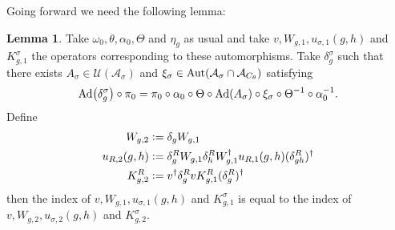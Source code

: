 \documentclass[12pt,a4paper,twoside]{article}
\newcommand{\defeq}{\vcentcolon=}
\let\originalleft\left
\let\originalright\right
\renewcommand{\left}{\mathopen{}\mathclose\bgroup\originalleft}
\renewcommand{\right}{\aftergroup\egroup\originalright}
\newcommand{\UU}{\mathcal U}
\renewcommand{\AA}{\mathcal A}
\newcommand{\Ad}[1]{\textrm{Ad}\left(#1\right)}
\newcommand{\Aut}[1]{\textrm{Aut}\left(#1\right)}
\theoremstyle{definition}
\newtheorem{lemma}[theorem]{Lemma}
\numberwithin{equation}{section}
\begin{document}
Going forward we need the following lemma:
\begin{lemma}\label{lem:TransformationUnderDelta}
	Take $\omega_0,\theta,\alpha_0,\Theta$ and $\eta_g$ as usual and take $v,W_{g,1},u_{\sigma,1}(g,h)$ and $K_{g,1}^\sigma$ the operators corresponding to these automorphisms. Take $\delta^\sigma_g$ such that there exists $A_\sigma\in\UU(\AA_{\sigma})$ and $\xi_\sigma\in\Aut{\AA_\sigma\cap \AA_{C_\theta}}$ satisfying
	\begin{equation}
		\Ad{\delta^\sigma_g}\circ\pi_0=\pi_0\circ\alpha_0\circ\Theta\circ\Ad{A_\sigma}\circ\xi_\sigma\circ\Theta^{-1}\circ\alpha_0^{-1}.
	\end{equation}
	Define
	\begin{align}
		W_{g,2}&\defeq\delta_g W_{g,1}\\
		u_{R,2}(g,h)&\defeq \delta_g^R W_{g,1}\delta_h^R W_{g,1}^\dagger u_{R,1}(g,h)(\delta_{gh}^R)^\dagger\\
		K^R_{g,2}&\defeq v^\dagger \delta_g^R v K_{g,1}^R (\delta_g^R)^\dagger
	\end{align}
	then the index of $v,W_{g,1},u_{\sigma,1}(g,h)$ and $K_{g,1}^\sigma$ is equal to the index of $v,W_{g,2},u_{\sigma,2}(g,h)$ and $K_{g,2}^\sigma$.
\end{lemma}
\end{document}
